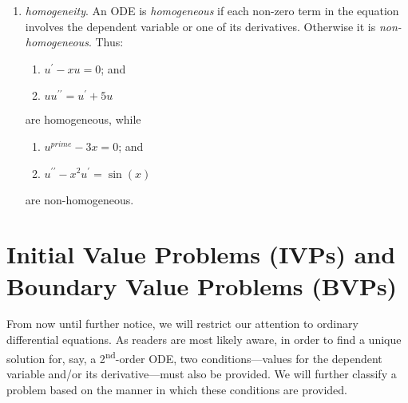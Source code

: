 \begin{enumerate}
\item \emph{homogeneity}.  An ODE is \emph{homogeneous} if each non-zero term in the equation involves the dependent variable or one of its derivatives.  Otherwise it is \emph{non-homogeneous}.  Thus:
\begin{enumerate}
\item $u^{\prime} - xu = 0$; and
\item $u u^{\prime \prime} = u^{\prime} + 5u$
\end{enumerate}
are homogeneous, while
\begin{enumerate}
\item $u^{prime} - 3x = 0$; and
\item $u^{\prime \prime} - x^2u^{\prime} = \sin{(x)}$
\end{enumerate}
are non-homogeneous.

\end{enumerate}


\section{Initial Value Problems (IVPs) and Boundary Value Problems (BVPs)}
From now until further notice, we will restrict our attention to ordinary differential equations.  As readers are most likely aware, in order to find a unique solution for, say, a 2\textsuperscript{nd}-order ODE, two conditions---values for the dependent variable and/or its derivative---must also be provided.  We will further classify a problem based on the manner in which these conditions are provided.

